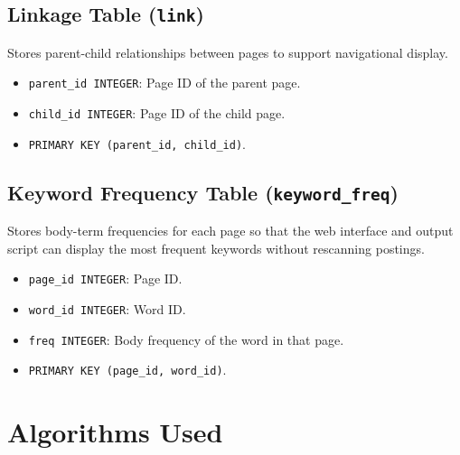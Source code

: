 \documentclass[11pt,a4paper]{article}
\begin{document}
\subsection{Linkage Table (\texttt{link})}
Stores parent-child relationships between pages to support navigational display.
\begin{itemize}
    \item \texttt{parent\_id INTEGER}: Page ID of the parent page.
    \item \texttt{child\_id INTEGER}: Page ID of the child page.
    \item \texttt{PRIMARY KEY (parent\_id, child\_id)}.
\end{itemize}

\subsection{Keyword Frequency Table (\texttt{keyword\_freq})}
Stores body-term frequencies for each page so that the web interface and output script can display the most frequent keywords without rescanning postings.
\begin{itemize}
    \item \texttt{page\_id INTEGER}: Page ID.
    \item \texttt{word\_id INTEGER}: Word ID.
    \item \texttt{freq INTEGER}: Body frequency of the word in that page.
    \item \texttt{PRIMARY KEY (page\_id, word\_id)}.
\end{itemize}

\section{Algorithms Used}
\end{document}
